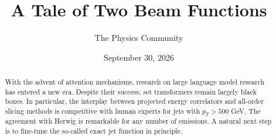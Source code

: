 \documentclass[11pt]{article}
\title{A Tale of Two Beam Functions}
\author{The Physics Community}
\date{September 30, 2026}
\numberwithin{equation}{section}
\theoremstyle{definition}
\theoremstyle{remark}
\begin{document}
\maketitle
\begin{abstract}
With the advent of attention mechanisms, research on large language
model research has entered a new era. Despite their success, set
transformers remain largely black boxes. In particular, the interplay
between projected energy correlators and all-order slicing methods is
competitive with human experts for jets with $p_T > 500$ GeV. The
agreement with Herwig is remarkable for any number of emissions. A
natural next step is to fine-tune the so-called exact jet function in
principle.
\end{abstract}
\tableofcontents




\nocite{*}


\end{document}
